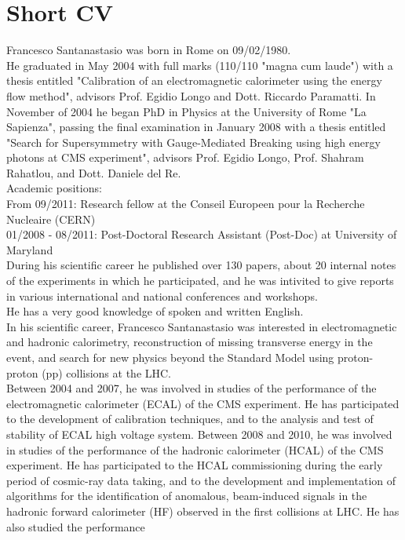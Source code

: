 \documentclass[10pt, a4paper]{article}
\begin{document}
\section*{Short CV}
Francesco Santanastasio was born in Rome on 09/02/1980. \\
He graduated in May 2004 with full marks (110/110 "magna cum laude") 
with a thesis entitled "Calibration of an electromagnetic calorimeter using the energy flow method", advisors Prof. Egidio Longo and Dott. Riccardo Paramatti. In November of 2004 he began PhD in Physics at the University of Rome "La Sapienza", passing the final examination in January 2008 with a thesis entitled "Search for Supersymmetry with Gauge-Mediated Breaking using high energy photons at CMS experiment", advisors Prof. Egidio Longo, Prof. Shahram Rahatlou, and Dott. Daniele del Re. \\
Academic positions: \\
From 09/2011: Research fellow at the Conseil Europeen pour la Recherche Nucleaire (CERN)\\ 
01/2008 - 08/2011: Post-Doctoral Research Assistant (Post-Doc) at University of Maryland\\
During his scientific career he published over 130 papers, about 20 internal notes of the experiments in which he participated, and he was intivited to give reports in various international and national conferences and workshops. \\
He has a very good knowledge of spoken and written English. \\ 
In his scientific career, Francesco Santanastasio was interested in electromagnetic and hadronic calorimetry, reconstruction of missing transverse energy in the event, and search for new physics beyond the Standard Model using proton-proton (pp) collisions at the LHC. \\
Between 2004 and 2007, he was involved in studies of the performance of the electromagnetic calorimeter (ECAL) of the CMS experiment. He has participated to the development of calibration techniques, and to the analysis and test of stability of ECAL high voltage system.
Between 2008 and 2010, he was involved in studies of the performance of the hadronic 
calorimeter (HCAL) of the CMS experiment. He has participated to the HCAL commissioning
during the early period of cosmic-ray data taking, and to the development and implementation 
of algorithms for the identification of anomalous, beam-induced signals in the hadronic forward calorimeter (HF) observed in the first collisions at LHC. He has also studied the performance 
\end{document}
